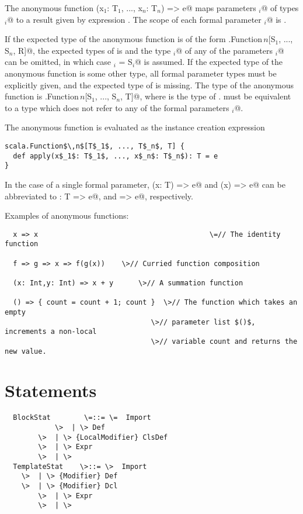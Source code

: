 \documentclass[11pt]{report}
\begin{document}
The anonymous function \verb@(x$_1$: T$_1$, ..., x$_n$: T$_n$) => e@
maps parameters \verb@x$_i$@ of types \verb@T$_i$@ to a result given
by expression \verb@e@. The scope of each formal parameter
\verb@x$_i$@ is \verb@e@.

If the expected type of the anonymous function is of the form
\verb@scala.Function$\,n$[S$_1$, ..., S$_n$, R]@, the expected types
of \verb@e@ is \verb@R@ and the type \verb@T$_i$@ of any of the
parameters \verb@x$_i$@ can be omitted, in which case
\verb@T$_i$ = S$_i$@ is assumed. If the expected type of the anonymous
function is some other type, all formal parameter types must be
explicitly given, and the expected type of \verb@e@ is missing. The
type of the anonymous function is
\verb@scala.Function$\,n$[S$_1$, ..., S$_n$, T]@, where \verb@T@ is
the type of \verb@e@. \verb@T@ must be equivalent to a type which does
not refer to any of the formal parameters \verb@x$_i$@.

The anonymous function is evaluated as the instance creation expression
\begin{verbatim}
scala.Function$\,n$[T$_1$, ..., T$_n$, T] {
  def apply(x$_1$: T$_1$, ..., x$_n$: T$_n$): T = e
}
\end{verbatim}
In the case of a single formal parameter, \verb@(x: T) => e@ and \verb@(x) => e@
can be abbreviated to \verb@x: T => e@, and \verb@x => e@, respectively.

\example Examples of anonymous functions:

\begin{verbatim}
  x => x                                         \=// The identity function

  f => g => x => f(g(x))	\>// Curried function composition

  (x: Int,y: Int) => x + y      \>// A summation function

  () => { count = count + 1; count }  \>// The function which takes an empty
                                   \>// parameter list $()$, increments a non-local
                                   \>// variable count and returns the new value.
\end{verbatim}

\section{Statements}
\label{sec:statements}

\syntax\begin{verbatim}
  BlockStat        \=::= \=  Import
            \>  | \> Def
	    \>  | \> {LocalModifier} ClsDef
	    \>  | \> Expr
	    \>  | \>
  TemplateStat    \>::= \>  Import
   	\>  | \> {Modifier} Def
	\>  | \> {Modifier} Dcl
        \>  | \> Expr
	    \>  | \>
\end{verbatim}
\end{document}
